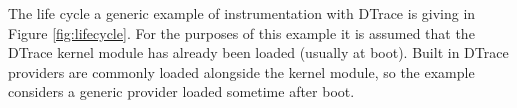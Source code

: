
The life cycle a generic example of instrumentation with DTrace is giving in Figure \ref{fig:lifecycle}. For the purposes of this example it is assumed that the DTrace kernel module has already been loaded (usually at boot). Built in DTrace providers are commonly loaded alongside the kernel module, so the example considers a generic provider loaded sometime after boot.




